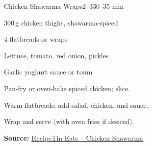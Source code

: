 \begin{recipebox}{Chicken Shawarma Wraps}{2--3}{30–35 min}
\begin{ingredients}
  \item 300\,g chicken thighs, shawarma-spiced
  \item 4 flatbreads or wraps
  \item Lettuce, tomato, red onion, pickles
  \item Garlic yoghurt sauce or toum
\end{ingredients}
\begin{method}
  \item Pan-fry or oven-bake spiced chicken; slice.
  \item Warm flatbreads; add salad, chicken, and sauce.
  \item Wrap and serve (with oven fries if desired).
\end{method}
\textbf{Source:} \href{https://www.recipetineats.com/chicken-shawarma-middle-eastern/}{RecipeTin Eats – Chicken Shawarma}
\end{recipebox}
